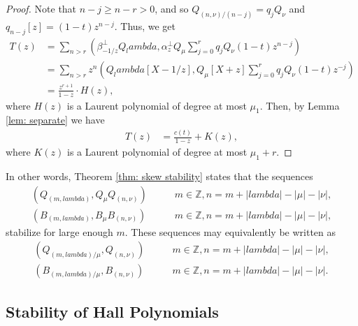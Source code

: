 \documentclass[12pt]{amsart}%
\def\lambda{lambda}%
\theoremstyle{remark}
\theoremstyle{definition}
\newcommand{\Z}{\mathbb{Z}}
\begin{document}
\begin{proof}
        Note that $n-j\geq n-r>0$, and so $Q_{(n,\nu)/(n-j)}=q_jQ_\nu$ and $q_{n-j}[z]=(1-t)z^{n-j}$. Thus, we get
        \begin{align*}
            T(z)&=\sum_{n>r}\left(\beta_{-1/z}^\perp Q_\lambda,\alpha_z^\perp Q_\mu \sum_{j=0}^rq_jQ_\nu(1-t)z^{n-j}\right)\\
            &=\sum_{n>r}z^n\left(Q_\lambda[X-1/z],Q_\mu[X+z] \sum_{j=0}^rq_jQ_\nu(1-t)z^{-j}\right)\\
            &=\frac{z^{r+1}}{1-z}\cdot H(z),
        \end{align*}
        where $H(z)$ is a Laurent polynomial of degree at most $\mu_1$. Then, by Lemma \ref{lem: separate} we have
        \begin{align*}
            T(z)&=\frac{c(t)}{1-z}+K(z),
        \end{align*}
        where $K(z)$ is a Laurent polynomial of degree at most $\mu_1+r$.
    \end{proof}

    In other words, Theorem \ref{thm: skew stability} states that the sequences
    \begin{align*}
        (Q_{(m,\lambda)},Q_\mu Q_{(n,\nu)})&\qquad m\in\Z,n=m+|\lambda|-|\mu|-|\nu|,\\
        (B_{(m,\lambda)},B_\mu B_{(n,\nu)})&\qquad m\in\Z,n=m+|\lambda|-|\mu|-|\nu|,
    \end{align*}
    stabilize for large enough $m$. These sequences may equivalently be written as
    \begin{align*}
        (Q_{(m,\lambda)/\mu},Q_{(n,\nu)})&\qquad m\in\Z,n=m+|\lambda|-|\mu|-|\nu|,\\
        (B_{(m,\lambda)/\mu},B_{(n,\nu)})&\qquad m\in\Z,n=m+|\lambda|-|\mu|-|\nu|.
    \end{align*}

    \subsection{Stability of Hall Polynomials}
\end{document}
